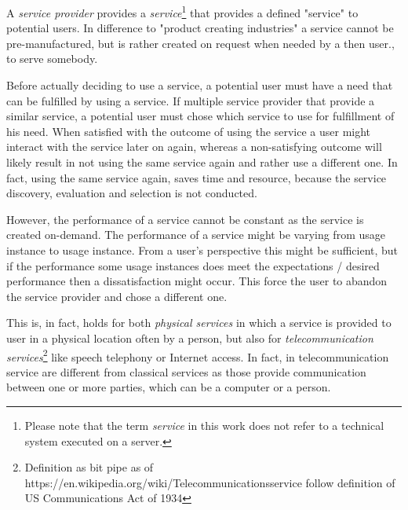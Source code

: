 A \emph{service provider} provides a \emph{service}\footnote{Please note that the term \emph{service} in this work does not refer to a technical system executed on a server.} that provides a defined "service" to potential users.
In difference to "product creating industries" a service cannot be pre-manufactured, but is rather created on request when needed by a then user., \ie to serve somebody.

Before actually deciding to use a service, a potential user must have a need that can be fulfilled by using a service. %
If multiple service provider that provide a similar service, a potential user must chose which service to use for fulfillment of his need.
When satisfied with the outcome of using the service a user might interact with the service later on again, whereas a non-satisfying outcome will likely result in not using the same service again and rather use a different one.
In fact, using the same service again, saves time and resource, because the service discovery, evaluation and selection is not conducted.

However, the performance of a service cannot be constant as the service is created on-demand.
The performance of a service might be varying from usage instance to usage instance.
From a user's perspective this might be sufficient, but if the performance some usage instances does meet the expectations / desired performance then a dissatisfaction might occur.
This force the user to abandon the service provider and chose a different one.

This is, in fact, holds for both \emph{physical services} in which a service is provided to user in a physical location often by a person, but also for \emph{telecommunication services}\footnote{Definition as bit pipe as of https://en.wikipedia.org/wiki/Telecommunicationsservice follow definition of US Communications Act of 1934} like speech telephony or Internet access.
In fact, in telecommunication service are different from classical services as those provide communication between one or more parties, which can be a computer or a person.

